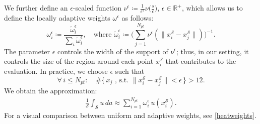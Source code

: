 \documentclass[12pt,openany]{book}
\newcommand{\R}{\mathbb{R}}
\def\S{\mathcal{S}}
\theoremstyle{plainnormal}
\theoremstyle{remark}
\begin{document}
We further define an $\epsilon$-scaled function $\nu^\epsilon \coloneqq \frac{1}{\epsilon ^3}\nu\big(\frac{s}{\epsilon}\big)$, $\epsilon \in \R^+$, which allows us to define the locally adaptive weights $\omega^\epsilon$ as follows:
$$\omega_i^\epsilon\coloneqq \frac{\tilde{\omega}_i^\epsilon}{\sum_i\tilde{\omega}_i^\epsilon}, \quad \text{where } \tilde{\omega}_i^\epsilon\coloneqq \Bigg(\sum_{j=1}^{N_{pt}}\nu^\epsilon(\|x_i^\S-x_j^\S\|)\Bigg)^{-1}.$$
The parameter $\epsilon$ controls the width of the support of $\nu^\epsilon$; thus, in our setting, it controls the size of the region around each point \( x_i^{\mathcal{S}} \) that contributes to the evaluation. In practice, we choose $\epsilon$ such that$$\forall\, i \leq N_{pt}:\quad\#\{\,x_j \text{ , s.t. } \|x_i^\S - x_j^\S\| < \epsilon\,\} > 12.$$ 
We obtain the approximation: 
\begin{align}\label{weighted_sum_heat}
    \frac{1}{\S}\int_\S u\, da\approx \sum_{i=1}^{N_{pt}}\omega_i^\epsilon\, u(x_i^\S).
\end{align}
For a visual comparison between uniform and adaptive weights, see \cref{heatweights}.
\end{document}
